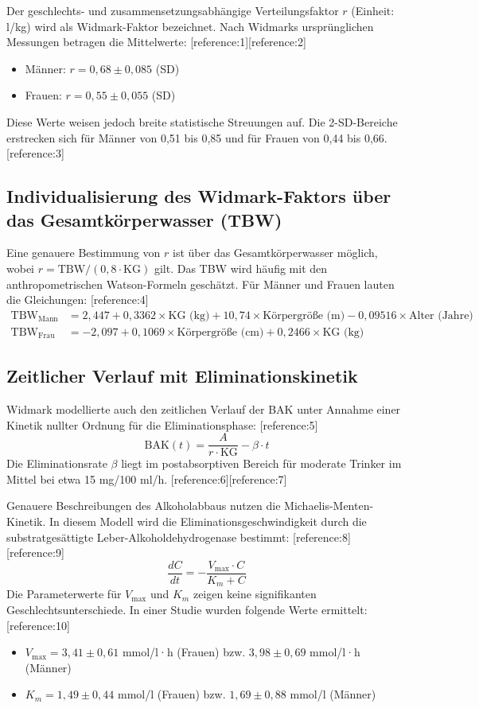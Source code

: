 \documentclass[11pt,a4paper]{article}
\begin{document}
	Der geschlechts- und zusammensetzungsabhängige Verteilungsfaktor $r$ (Einheit: l/kg) wird als Widmark-Faktor bezeichnet. Nach Widmarks ursprünglichen Messungen betragen die Mittelwerte: [reference:1][reference:2]
	\begin{itemize}
		\item Männer: $r = 0,68 \pm 0,085$ (SD)
		\item Frauen: $r = 0,55 \pm 0,055$ (SD)
	\end{itemize}
	
	Diese Werte weisen jedoch breite statistische Streuungen auf. Die 2-SD-Bereiche erstrecken sich für Männer von 0,51 bis 0,85 und für Frauen von 0,44 bis 0,66. [reference:3]
	
	\subsection{Individualisierung des Widmark-Faktors über das Gesamtkörperwasser (TBW)}
	Eine genauere Bestimmung von $r$ ist über das Gesamtkörperwasser möglich, wobei $r = \text{TBW} / (0,8 \cdot \text{KG})$ gilt. Das TBW wird häufig mit den anthropometrischen Watson-Formeln geschätzt. Für Männer und Frauen lauten die Gleichungen: [reference:4]
	\begin{align}
		\text{TBW}_{\text{Mann}} &= 2,447 + 0,3362 \times \text{KG (kg)} + 10,74 \times \text{Körpergröße (m)} - 0,09516 \times \text{Alter (Jahre)} \\
		\text{TBW}_{\text{Frau}} &= -2,097 + 0,1069 \times \text{Körpergröße (cm)} + 0,2466 \times \text{KG (kg)}
	\end{align}
	
	\subsection{Zeitlicher Verlauf mit Eliminationskinetik}
	Widmark modellierte auch den zeitlichen Verlauf der BAK unter Annahme einer Kinetik nullter Ordnung für die Eliminationsphase: [reference:5]
	\[
	\text{BAK}(t) = \frac{A}{r \cdot \text{KG}} - \beta \cdot t
	\]
	Die Eliminationsrate $\beta$ liegt im postabsorptiven Bereich für moderate Trinker im Mittel bei etwa 15 mg/100 ml/h. [reference:6][reference:7]
	
	Genauere Beschreibungen des Alkoholabbaus nutzen die Michaelis-Menten-Kinetik. In diesem Modell wird die Eliminationsgeschwindigkeit durch die substratgesättigte Leber-Alkoholdehydrogenase bestimmt: [reference:8][reference:9]
	\[
	\frac{dC}{dt} = -\frac{V_{\text{max}} \cdot C}{K_m + C}
	\]
	Die Parameterwerte für $V_{\text{max}}$ und $K_m$ zeigen keine signifikanten Geschlechtsunterschiede. In einer Studie wurden folgende Werte ermittelt: [reference:10]
	\begin{itemize}
		\item $V_{\text{max}} = 3,41 \pm 0,61$ mmol/l·h (Frauen) bzw. $3,98 \pm 0,69$ mmol/l·h (Männer)
		\item $K_m = 1,49 \pm 0,44$ mmol/l (Frauen) bzw. $1,69 \pm 0,88$ mmol/l (Männer)
	\end{itemize}
	
\end{document}
